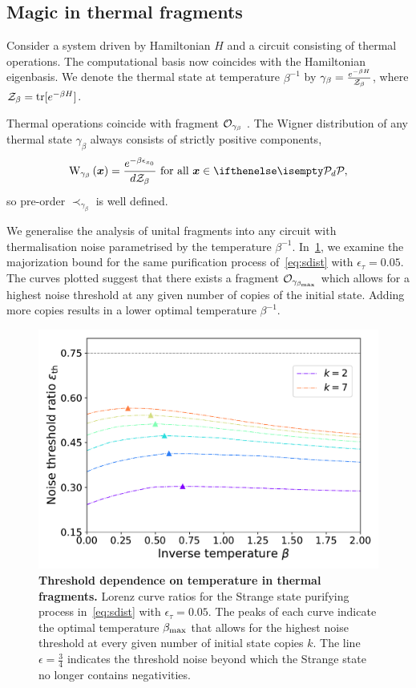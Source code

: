 \documentclass[pra,
aps,
twocolumn,
superscriptaddress,
groupedaddress,
nofootinbib,
reprint
]{revtex4-1}
\begin{document}
\newpage

\subsection{Magic in thermal fragments}\label{sec:thermal}

Consider a system driven by Hamiltonian $H$ and a circuit consisting of thermal operations.
The computational basis now coincides with the Hamiltonian eigenbasis.
We denote the thermal state at temperature $\beta^{-1}$ by $\gamma_\beta = \frac{e^{-\beta H}}{\mathcal{Z}_\beta}$, where $\mathcal{Z}_\beta = {\rm{tr}}[e^{-\beta H}]$.

Thermal operations coincide with fragment $\mathcal{O}_{\gamma_\beta}$ .
The Wigner distribution of any thermal state $\gamma_\beta$ always consists of strictly positive components,
\begin{equation}
	\W[\bmx]{\gamma_\beta} = \frac{e^{-\beta \epsilon_{x_0}}}{d\Z_\beta}\ \text{for all}\ \bmx \in \pd,
\end{equation}
so pre-order $\prec_{\gamma_\beta}$ is well defined.

We generalise the analysis of unital fragments into any circuit with thermalisation noise parametrised by the temperature $\beta^{-1}$.
In~\cref{fig:thermal_distill}, we examine the majorization bound for the same purification process of~\cref{eq:sdist} with $\epsilon_\tau = 0.05$.
The curves plotted suggest that there exists a fragment $\mathcal{O}_{\gamma_{\beta_{\rm{max}}}}$ which allows for a highest noise threshold at any given number of copies of the initial state.
Adding more copies results in a lower optimal temperature $\beta^{-1}$.

\begin{figure}
    \centering
    \includegraphics[scale=0.5]{figs/thermal_distill.pdf}
    \caption{\textbf{Threshold dependence on temperature in thermal fragments.} Lorenz curve ratios for the Strange state purifying process in~\cref{eq:sdist} with $\epsilon_\tau = 0.05$.
    The peaks of each curve indicate the optimal temperature $\beta_{\rm{max}}$ that allows for the highest noise threshold at every given number of initial state copies $k$.
    The line $\epsilon = \frac{3}{4}$ indicates the threshold noise beyond which the Strange state no longer contains negativities.
    }
    \label{fig:thermal_distill}
\end{figure}
\end{document}

